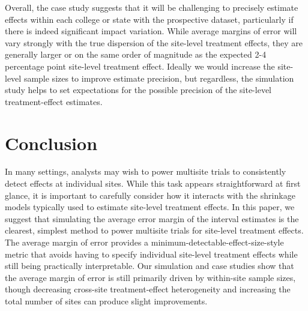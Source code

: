 \documentclass[]{article}
\begin{document}
Overall, the case study suggests that it will be challenging to precisely estimate effects within each college or state with the prospective dataset, particularly if there is indeed significant impact variation.
While average margins of error will vary strongly with the true dispersion of the site-level treatment effects, they are generally larger or on the same order of magnitude as the expected 2-4 percentage point site-level treatment effect.
Ideally we would increase the site-level sample sizes to improve estimate precision, but regardless, the simulation study helps to set expectations for the possible precision of the site-level treatment-effect estimates.

\section{Conclusion}

In many settings, analysts may wish to power multisite trials to consistently detect effects at individual sites.
While this task appears straightforward at first glance, it is important to carefully consider how it interacts with the shrinkage models typically used to estimate site-level treatment effects.
In this paper, we suggest that simulating the average error margin of the interval estimates is the clearest, simplest method to power multisite trials for site-level treatment effects.
The average margin of error provides a minimum-detectable-effect-size-style metric that avoids having to specify individual site-level treatment effects while still being practically interpretable.
Our simulation and case studies show that the average margin of error is still primarily driven by within-site sample sizes, though decreasing cross-site treatment-effect heterogeneity and increasing the total number of sites can produce slight improvements.



	
\end{document}
